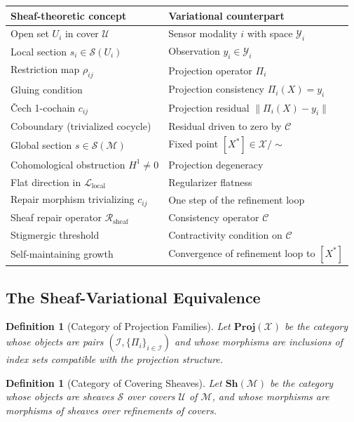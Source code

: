\documentclass[12pt, oneside]{article}
\newtheorem{definition}[theorem]{Definition}
\newcommand{\Xmod}{\mathcal{X}/{\sim}}
\begin{document}
\begin{center}
\begin{tabular}{ll}
\toprule
\textbf{Sheaf-theoretic concept} & \textbf{Variational counterpart} \\
\midrule
Open set $U_i$ in cover $\mathcal{U}$ & Sensor modality $i$ with space $\mathcal{Y}_i$ \\
Local section $s_i \in \mathcal{S}(U_i)$ & Observation $y_i \in \mathcal{Y}_i$ \\
Restriction map $\rho_{ij}$ & Projection operator $\Pi_i$ \\
Gluing condition & Projection consistency $\Pi_i(X) = y_i$ \\
\v{C}ech 1-cochain $c_{ij}$ & Projection residual $\|\Pi_i(X) - y_i\|$ \\
Coboundary (trivialized cocycle) & Residual driven to zero by $\mathcal{C}$ \\
Global section $s \in \mathcal{S}(\mathcal{M})$ & Fixed point $[X^*] \in \Xmod$ \\
Cohomological obstruction $H^1 \ne 0$ & Projection degeneracy \\
Flat direction in $\mathcal{L}_{\mathrm{local}}$ & Regularizer flatness \\
Repair morphism trivializing $c_{ij}$ & One step of the refinement loop \\
Sheaf repair operator $\mathcal{R}_{\mathrm{sheaf}}$ & Consistency operator $\mathcal{C}$ \\
Stigmergic threshold & Contractivity condition on $\mathcal{C}$ \\
Self-maintaining growth & Convergence of refinement loop to $[X^*]$ \\
\bottomrule
\end{tabular}
\end{center}

\subsection{The Sheaf-Variational Equivalence}

\begin{definition}[Category of Projection Families]
Let $\mathbf{Proj}(\mathcal{X})$ be the category whose objects are pairs
$(\mathcal{I}, \{\Pi_i\}_{i \in \mathcal{I}})$ and whose morphisms are inclusions of
index sets compatible with the projection structure.
\end{definition}

\begin{definition}[Category of Covering Sheaves]
Let $\mathbf{Sh}(\mathcal{M})$ be the category whose objects are sheaves $\mathcal{S}$
over covers $\mathcal{U}$ of $\mathcal{M}$, and whose morphisms are morphisms of sheaves
over refinements of covers.
\end{definition}
\end{document}

